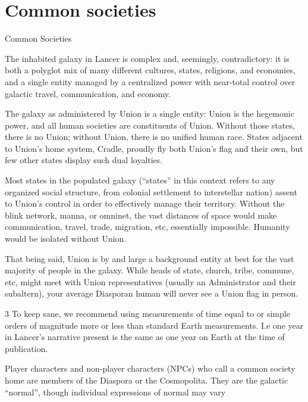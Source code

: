    

           
\section{Common societies}
Common Societies  

The inhabited galaxy in Lancer is complex and, seemingly, contradictory: it is both a polyglot mix  
of many different cultures, states, religions, and economies, and a single entity managed by a  
centralized power with near-total control over galactic travel, communication, and economy.
 

The galaxy as administered by Union is a single entity: Union is the hegemonic power, and all  
human societies are constituents of Union. Without those states, there is no Union; without  
Union, there is no unified human race. States adjacent to Union’s home system, Cradle, proudly  
fly both Union’s flag and their own, but few other states display such dual loyalties. 
 

Most states in the populated galaxy (“states” in this context refers to any organized social  
structure, from colonial settlement to interstellar nation) assent to Union’s control in order to  
effectively manage their territory. Without the blink network, manna, or omninet, the vast  
distances of space would make communication, travel, trade, migration, etc, essentially  
impossible. Humanity would be isolated without Union. 
 

That being said, Union is by and large a background entity at best for the vast majority of people  
in the galaxy. While heads of state, church, tribe, commune, etc, might meet with Union  
representatives (usually an Administrator and their subaltern), your average Diasporan human will  
never see a Union flag in person. 
 

3 To keep sane, we recommend using measurements of time equal to or simple orders of magnitude more  
or less than standard Earth measurements. I.e one year in Lancer’s narrative present is the same as one  
year on Earth at the time of publication.  

                                                                                                                       


Player characters and non-player characters (NPCs) who call a common society home are  
members of the Diaspora or the Cosmopolita. They are the galactic “normal”, though individual  
expressions of normal may vary 
 

